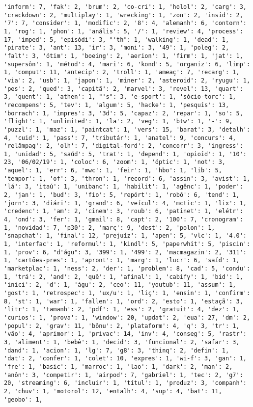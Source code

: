\documentclass[11pt]{article}
\begin{document}
\begin{Verbatim}[commandchars=\\\{\}]
'inform': 7, 'fak': 2, 'brum': 2, 'co-cri': 1, 'holol': 2, 'carg': 3, 'crackdown': 2, 'multiplay': 1, 'wrecking': 1, 'zon': 2, 'insid': 2, '7': 7, 'consider': 1, 'modific': 2, '8': 4, 'alemanh': 6, 'contorn': 1, 'rog': 1, 'phon': 1, 'anális': 5, '/': 1, 'review': 4, 'process': 17, 'imped': 5, 'episódi': 3, "'th": 1, 'walking': 1, 'dead': 1, 'pirate': 3, 'ant': 13, 'ir': 3, 'moni': 3, '49': 1, 'poleg': 2, 'falt': 3, 'ótim': 1, 'boeing': 2, 'aerion': 1, 'firm': 1, 'jat': 1, 'supersôn': 1, 'métod': 4, 'mari': 6, 'kond': 5, 'organiz': 6, 'limp': 1, 'comput': 11, 'antecip': 2, 'troll': 1, 'ameaç': 7, 'recarg': 1, 'via': 2, 'usb': 1, 'japon': 1, 'miner': 2, 'asteroid': 2, 'ryugu': 1, 'pes': 2, 'qued': 3, 'capitã': 2, 'marvel': 3, 'revel': 13, 'quart': 3, 'quent': 1, 'athen': 1, "'s": 3, 'e-sport': 1, 'sócio-torc': 1, 'recompens': 5, 'tev': 1, 'algum': 5, 'hacke': 1, 'pesquis': 13, 'borrach': 1, 'impres': 3, '3d': 5, 'capaz': 2, 'repar': 1, 'so': 5, 'flight': 1, 'unlimited': 1, 'la': 2, 'veg': 1, 'btw': 1, '-': 9, 'puzzl': 1, 'maz': 1, 'paintcat': 1, 'vers': 15, 'barat': 3, 'detalh': 4, 'cuid': 1, 'pass': 7, 'tributár': 1, 'anatel': 9, 'concurs': 4, 'relâmpag': 2, 'olh': 7, 'digital-ford': 2, 'concorr': 3, 'ingress': 1, 'unidad': 5, 'saúd': 5, 'trat': 1, 'depend': 1, 'opioid': 1, '10': 23, '06/02/19': 1, 'coloc': 6, 'zoom': 1, 'óptic': 1, 'not': 3, 'aquel': 1, 'err': 6, 'mwc': 1, 'feir': 1, 'hbo': 1, 'lib': 5, 'tempor': 1, 'of': 3, 'thron': 1, 'record': 6, 'assin': 3, 'avist': 1, 'lá': 3, 'itaú': 1, 'unibanc': 1, 'habilit': 1, 'agênc': 1, 'poder': 2, 'jan': 1, 'bud': 3, 'fio': 5, 'repórt': 1, 'robô': 6, 'tend': 1, 'jorn': 3, 'diári': 1, 'grand': 6, 'veícul': 4, 'mctic': 1, 'lix': 1, 'credenc': 1, 'am': 2, 'cinem': 3, 'roub': 6, 'patinet': 1, 'elétr': 4, 'ond': 3, 'fer': 1, 'gmail': 8, 'capt': 2, '100': 7, 'cronogram': 1, 'novidad': 7, 'p30': 2, 'març': 9, 'dest': 2, 'polon': 1, 'snapchat': 1, 'final': 12, 'prejuíz': 1, 'apen': 5, 'vlc': 1, '4.0': 1, 'interfac': 1, 'reformul': 1, 'kindl': 5, 'paperwhit': 5, 'piscin': 1, 'prov': 6, "d'águ": 3, '399': 1, '499': 2, 'macmagazin': 2, '311': 1, 'cartões-pres': 1, 'apront': 1, 'marg': 1, 'lucr': 6, 'saíd': 1, 'marketplac': 1, 'ness': 2, 'der': 1, 'problem': 8, 'cad': 5, 'condu': 1, 'trá': 2, 'and': 2, 'quê': 1, 'afinal': 1, 'cabify': 1, 'bid': 1, 'inici': 2, 'd': 1, 'águ': 2, 'ceo': 11, 'youtub': 11, 'assum': 1, 'gost': 1, 'retrospec': 1, 'ux/u': 1, 'liç': 1, 'ensin': 1, 'confirm': 8, 'st': 1, 'war': 1, 'fallen': 1, 'ord': 2, 'esto': 1, 'estaçã': 3, 'litr': 1, 'tamanh': 2, 'pdf': 1, 'ess': 2, 'gratuit': 4, 'dez': 1, 'curios': 1, 'prova': 1, 'window': 20, 'updat': 2, 'eua': 27, 'dm': 2, 'popul': 2, 'grav': 11, 'bônu': 2, 'plataform': 4, 'q': 3, 'tr': 1, 'vão': 4, 'aprimor': 1, 'privac': 14, 'inv': 4, 'conseg': 5, 'rastr': 3, 'aliment': 1, 'bebê': 1, 'decid': 3, 'funcional': 2, 'safar': 3, 'dand': 1, 'acion': 1, 'lg': 7, 'g8': 3, 'thinq': 2, 'defin': 1, 'dat': 2, 'confer': 1, 'colet': 10, 'expres': 1, 'wi-f': 3, 'gan': 1, 'fre': 1, 'basic': 1, 'marroc': 1, 'lao': 1, 'dark': 2, 'man': 2, 'anôn': 3, 'competir': 1, 'airpod': 7, 'gabriel': 1, 'tec': 2, 'g7': 20, 'streaming': 6, 'incluir': 1, 'títul': 1, 'produz': 3, 'companh': 2, 'chuv': 1, 'motorol': 12, 'entalh': 4, 'sup': 4, 'bat': 11, 'geobo': 1, 
\end{Verbatim}
\end{document}
